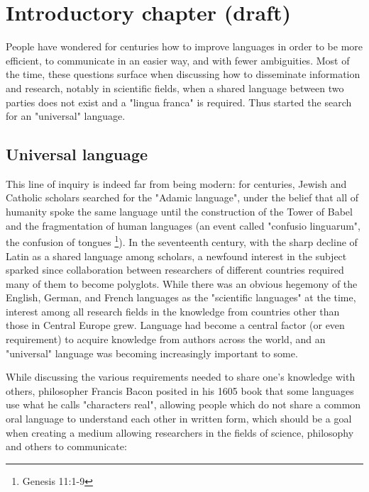 \chapter{Introductory chapter (draft)}

\vspace{0.5cm}

People have wondered for centuries how to improve languages in order to be more efficient, to communicate in an easier way, and with fewer ambiguities.
Most of the time, these questions surface when discussing how to disseminate information and research, notably in scientific fields, when a shared language
between two parties does not exist and a "lingua franca" is required. Thus started the search for an "universal" language.

\section{Universal language}

This line of inquiry is indeed far from being modern: for centuries, Jewish and Catholic scholars searched for the "Adamic language", under the belief that
all of humanity spoke the same language until the construction of the Tower of Babel and the fragmentation of human languages (an event called "confusio linguarum",
the confusion of tongues \footnote{Genesis 11:1-9}). In the seventeenth century, with the sharp decline of Latin as a shared language among scholars, a newfound interest in
the subject sparked since collaboration between researchers of different countries required many of them to become polyglots. While there was an obvious hegemony of the English,
German, and French languages as the "scientific languages" at the time, interest among all research fields in the knowledge from countries other than those in Central Europe grew.
Language had become a central factor (or even requirement) to acquire knowledge from authors across the world, and an "universal" language was becoming increasingly important to some.\newline

While discussing the various requirements needed to share one's knowledge with others, philosopher Francis Bacon posited in his 1605 book that some languages use what
he calls "characters real", allowing people which do not share a common oral language to understand each other in written form, which should be a goal when creating a
medium allowing researchers in the fields of science, philosophy and others to communicate:

